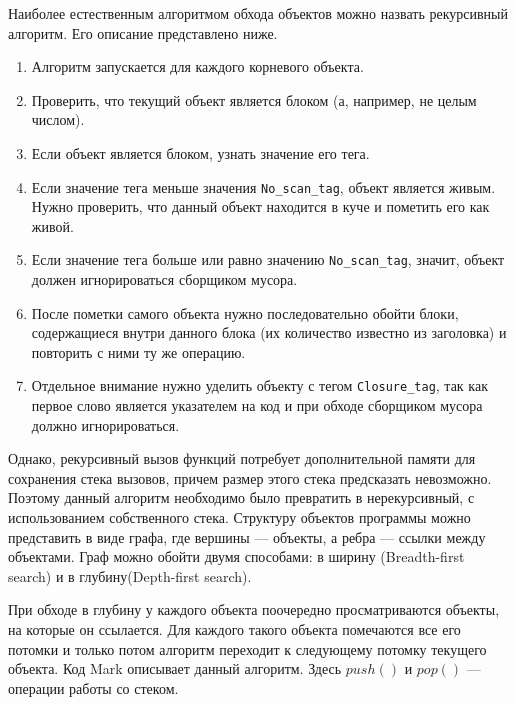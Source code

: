 Наиболее естественным алгоритмом обхода объектов можно назвать рекурсивный алгоритм. Его описание представлено ниже.
\begin{enumerate}
   \item Алгоритм запускается для каждого корневого объекта.
   \item Проверить, что текущий объект является блоком (а, например, не целым числом).
   \item Если объект является блоком, узнать значение его тега.
   \item Если значение тега меньше значения \texttt{No\_scan\_tag}, объект является живым. Нужно проверить, что
   данный объект находится в куче и пометить его как живой.
   \item Если значение тега больше или равно значению \texttt{No\_scan\_tag}, значит, объект должен игнорироваться сборщиком 
   мусора.
   \item После пометки самого объекта нужно последовательно обойти блоки, содержащиеся внутри данного блока 
   (их количество известно из заголовка) и повторить с ними ту же операцию.
   \item Отдельное внимание нужно уделить объекту с тегом \texttt{Closure\_tag}, так как первое слово является 
   указателем на код и при обходе сборщиком мусора должно игнорироваться.
\end{enumerate}

Однако, рекурсивный вызов функций потребует дополнительной памяти для сохранения стека вызовов, причем размер этого стека предсказать невозможно. Поэтому данный 
алгоритм необходимо было превратить в нерекурсивный, с использованием собственного стека. Структуру объектов программы можно представить в виде графа, где 
вершины --- объекты, а ребра --- ссылки между объектами. Граф можно обойти двумя способами: в ширину (Breadth-first search) и в глубину(Depth-first search).

При обходе в глубину у каждого объекта поочередно просматриваются объекты, на которые он ссылается. Для каждого такого объекта помечаются все его потомки и только 
потом алгоритм переходит к следующему потомку текущего объекта. Код Mark описывает данный алгоритм. Здесь $push()$ и $pop()$ --- операции работы со стеком.

